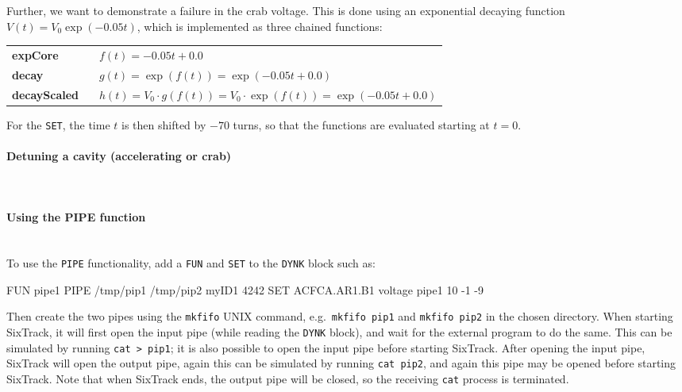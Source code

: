Further, we want to demonstrate a failure in the crab voltage.
This is done using an exponential decaying function $V(t) = V_0 \exp\left(-0.05 t\right)$, which is implemented as three chained functions:

\bigskip
\begin{tabular}{@{}lp{0.8\linewidth}}
    \textbf{expCore}     & $f(t) = -0.05 t + 0.0$ \\
    \textbf{decay}       & $g(t) = \exp(f(t)) = \exp(-0.05 t + 0.0)$ \\
    \textbf{decayScaled} & $h(t) = V_0 \cdot g(f(t)) = V_0 \cdot \exp(f(t)) = \exp(-0.05 t + 0.0)$
\end{tabular}

\bigskip
For the \texttt{SET}, the time $t$ is then shifted by $-70$ turns, so that the functions are evaluated starting at $t=0$.

\paragraph{Detuning a cavity (accelerating or crab)}~\\

\paragraph{Using the PIPE function}~\\

To use the \texttt{PIPE} functionality, add a \texttt{FUN} and \texttt{SET} to the \texttt{DYNK} block such as:
\begin{cverbatim}
FUN pipe1 PIPE /tmp/pip1 /tmp/pip2 myID1 4242
SET  ACFCA.AR1.B1 voltage pipe1 10 -1 -9
\end{cverbatim}
Then create the two pipes using the \texttt{mkfifo} UNIX command, e.g.\ \texttt{mkfifo~pip1} and \texttt{mkfifo~pip2} in the chosen directory.
When starting SixTrack, it will first open the input pipe (while reading the \texttt{DYNK} block), and wait for the external program to do the same.
This can be simulated by running \texttt{cat~>~pip1}; it is also possible to open the input pipe before starting SixTrack.
After opening the input pipe, SixTrack will open the output pipe, again this can be simulated by running \texttt{cat~pip2}, and again this pipe may be opened before starting SixTrack.
Note that when SixTrack ends, the output pipe will be closed, so the receiving \texttt{cat} process is terminated.

